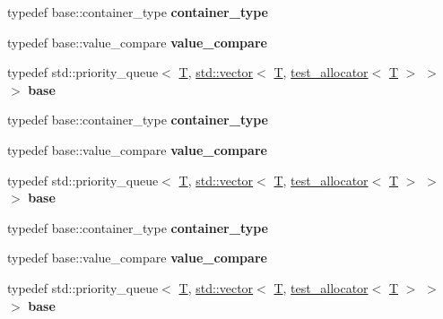 \begin{DoxyCompactItemize}
typedef base\+::container\+\_\+type {\bfseries container\+\_\+type}
\item 
\mbox{\label{structtest_adfa36bc6fd0cc112b780555f966052fc}} 
typedef base\+::value\+\_\+compare {\bfseries value\+\_\+compare}
\item 
\mbox{\label{structtest_a0e2f4e0bfb5de2fdb182d0f34c27fe7b}} 
typedef std\+::priority\+\_\+queue$<$ \mbox{\hyperlink{struct_t}{T}}, \mbox{\hyperlink{classstd_1_1vector}{std\+::vector}}$<$ \mbox{\hyperlink{struct_t}{T}}, \mbox{\hyperlink{classtest__allocator}{test\+\_\+allocator}}$<$ \mbox{\hyperlink{struct_t}{T}} $>$ $>$ $>$ {\bfseries base}
\item 
\mbox{\label{structtest_a73247bd60092d6e305cfa4fe71ba65a8}} 
typedef base\+::container\+\_\+type {\bfseries container\+\_\+type}
\item 
\mbox{\label{structtest_adfa36bc6fd0cc112b780555f966052fc}} 
typedef base\+::value\+\_\+compare {\bfseries value\+\_\+compare}
\item 
\mbox{\label{structtest_a0e2f4e0bfb5de2fdb182d0f34c27fe7b}} 
typedef std\+::priority\+\_\+queue$<$ \mbox{\hyperlink{struct_t}{T}}, \mbox{\hyperlink{classstd_1_1vector}{std\+::vector}}$<$ \mbox{\hyperlink{struct_t}{T}}, \mbox{\hyperlink{classtest__allocator}{test\+\_\+allocator}}$<$ \mbox{\hyperlink{struct_t}{T}} $>$ $>$ $>$ {\bfseries base}
\item 
\mbox{\label{structtest_a73247bd60092d6e305cfa4fe71ba65a8}} 
typedef base\+::container\+\_\+type {\bfseries container\+\_\+type}
\item 
\mbox{\label{structtest_adfa36bc6fd0cc112b780555f966052fc}} 
typedef base\+::value\+\_\+compare {\bfseries value\+\_\+compare}
\item 
\mbox{\label{structtest_a0e2f4e0bfb5de2fdb182d0f34c27fe7b}} 
typedef std\+::priority\+\_\+queue$<$ \mbox{\hyperlink{struct_t}{T}}, \mbox{\hyperlink{classstd_1_1vector}{std\+::vector}}$<$ \mbox{\hyperlink{struct_t}{T}}, \mbox{\hyperlink{classtest__allocator}{test\+\_\+allocator}}$<$ \mbox{\hyperlink{struct_t}{T}} $>$ $>$ $>$ {\bfseries base}
\item 

\end{DoxyCompactItemize}
